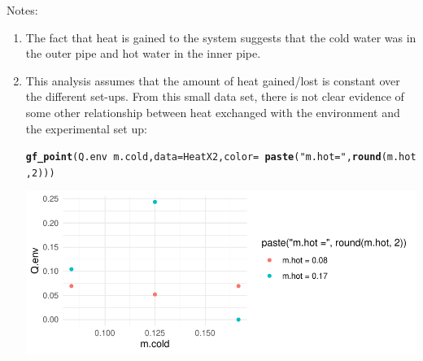 \documentclass[twoside]{book}\usepackage[]{graphicx}\usepackage[]{xcolor}
\makeatletter
\def\maxwidth{ %
  \ifdim\Gin@nat@width>\linewidth
    \linewidth
  \else
    \Gin@nat@width
  \fi
}
\newcommand{\hlnum}[1]{\textcolor[rgb]{0.686,0.059,0.569}{#1}}%
\newcommand{\hlstr}[1]{\textcolor[rgb]{0.192,0.494,0.8}{#1}}%
\newcommand{\hlopt}[1]{\textcolor[rgb]{0,0,0}{#1}}%
\newcommand{\hlstd}[1]{\textcolor[rgb]{0.345,0.345,0.345}{#1}}%
\newcommand{\hlkwc}[1]{\textcolor[rgb]{0.333,0.667,0.333}{#1}}%
\newcommand{\hlkwd}[1]{\textcolor[rgb]{0.737,0.353,0.396}{\textbf{#1}}}%
\newenvironment{kframe}{%
 \def\at@end@of@kframe{}%
 \ifinner\ifhmode%
  \def\at@end@of@kframe{\end{minipage}}%
  \begin{minipage}{\columnwidth}%
 \fi\fi%
 \def\FrameCommand##1{\hskip\@totalleftmargin \hskip-\fboxsep
 \colorbox{shadecolor}{##1}\hskip-\fboxsep
     \hskip-\linewidth \hskip-\@totalleftmargin \hskip\columnwidth}%
 \MakeFramed {\advance\hsize-\width
   \@totalleftmargin\z@ \linewidth\hsize
   \@setminipage}}%
 {\par\unskip\endMakeFramed%
 \at@end@of@kframe}
\newenvironment{knitrout}{}{} %
\makeatother
\begin{document}
Notes:
\begin{enumerate}
\item
The fact that heat is gained to the system suggests that the cold water was in the
outer pipe and hot water in the inner pipe.
\item  This analysis assumes that the amount of heat gained/lost is constant over 
the different set-ups.  From this small data set, there is not clear evidence 
of some other relationship between heat exchanged with the environment
and the experimental set up:
\begin{knitrout}
\color{fgcolor}\begin{kframe}
\begin{alltt}
\hlkwd{gf_point}\hlstd{(Q.env} \hlopt{~} \hlstd{m.cold,} \hlkwc{data} \hlstd{= HeatX2,} \hlkwc{color} \hlstd{=} \hlopt{~} \hlkwd{paste}\hlstd{(}\hlstr{"m.hot ="}\hlstd{,} \hlkwd{round}\hlstd{(m.hot,}\hlnum{2}\hlstd{)))}
\end{alltt}
\end{kframe}

{\centering \includegraphics[width=\maxwidth]{figures/fig-unnamed-chunk-338-1} 

}




\end{knitrout}
\end{enumerate}
\end{document}
